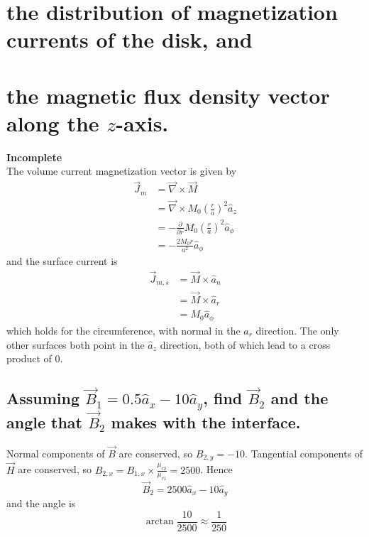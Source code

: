 \documentclass[answers]{exam}
\begin{document}
\begin{questions}
\begin{parts}
    \part{the distribution of magnetization currents of the disk, and}
    \part{the magnetic flux density vector along the $z$-axis.}
\end{parts}

\begin{solution}
    \textbf{Incomplete} \\
    The volume current magnetization vector is given by
    \begin{align*}
        \vec J_m &= \vec\nabla \times \vec M \\
                 &= \vec\nabla \times M_0\left(\frac{r}{a}\right)^2 \hat a_z \\
                 &= -\frac{\partial}{\partial r} M_0\left(\frac{r}{a}\right)^2 \hat a_\phi \\
                 &= -\frac{2M_0r}{a^2} \hat a_\phi
    \end{align*}
    and the surface current is
    \begin{align*}
        \vec J_{m,s} &= \vec M \times \hat a_n \\
                     &= \vec M \times \hat a_r \\
                     &= M_0 \hat a_\phi
    \end{align*}
    which holds for the circumference, with normal in the $\hat a_r$ direction. The only other surfaces both point in the $\hat a_z$ direction, both of which lead to a cross product of 0.
\end{solution}


\begin{parts}
    \part{Assuming $\vec B_1 = 0.5\hat a_x - 10\hat a_y$, find $\vec B_2$ and the angle that $\vec B_2$ makes with the interface.}

    \begin{solution}
        Normal components of $\vec B$ are conserved, so $B_{2,y} = -10$. Tangential components of $\vec H$ are conserved, so $B_{2,x} = B_{1,x}\times\frac{\mu_{r2}}{\mu_{r1}} = 2500$. Hence
        $$\vec B_2 = 2500\hat a_x - 10\hat a_y$$
        and the angle is
        $$\arctan\frac{10}{2500} \approx \frac{1}{250}$$
    \end{solution}
    

\end{parts}
\end{questions}
\end{document}
